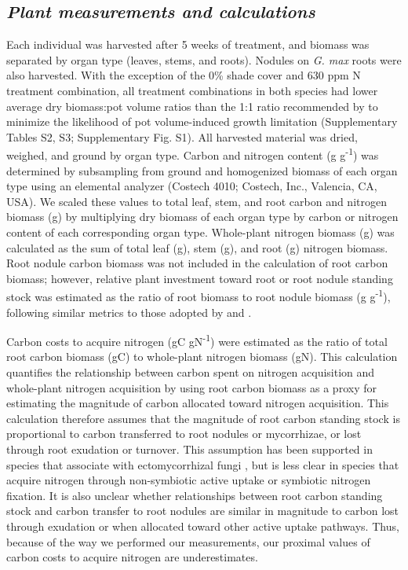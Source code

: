 \subsection{\textit{Plant measurements and calculations}}
Each individual was harvested after 5 weeks of treatment, and biomass was separated by organ type (leaves, stems, and roots). Nodules on \textit{G. max} roots were also harvested. With the exception of the 0\% shade cover and 630 ppm N treatment combination, all treatment combinations in both species had lower average dry biomass:pot volume ratios than the 1:1 ratio recommended by  to minimize the likelihood of pot volume-induced growth limitation (Supplementary Tables S2, S3; Supplementary Fig. S1). All harvested material was dried, weighed, and ground by organ type. Carbon and nitrogen content (g g\textsuperscript{-1}) was determined by subsampling from ground and homogenized biomass of each organ type using an elemental analyzer (Costech 4010; Costech, Inc., Valencia, CA, USA). We scaled these values to total leaf, stem, and root carbon and nitrogen biomass (g) by multiplying dry biomass of each organ type by carbon or nitrogen content of each corresponding organ type. Whole-plant nitrogen biomass (g) was calculated as the sum of total leaf (g), stem (g), and root (g) nitrogen biomass. Root nodule carbon biomass was not included in the calculation of root carbon biomass; however, relative plant investment toward root or root nodule standing stock was estimated as the ratio of root biomass to root nodule biomass (g g\textsuperscript{-1}), following similar metrics to those adopted by  and .

Carbon costs to acquire nitrogen (gC gN\textsuperscript{-1}) were estimated as the ratio of total root carbon biomass (gC) to whole-plant nitrogen biomass (gN). This calculation quantifies the relationship between carbon spent on nitrogen acquisition and whole-plant nitrogen acquisition by using root carbon biomass as a proxy for estimating the magnitude of carbon allocated toward nitrogen acquisition. This calculation therefore assumes that the magnitude of root carbon standing stock is proportional to carbon transferred to root nodules or mycorrhizae, or lost through root exudation or turnover. This assumption has been supported in species that associate with ectomycorrhizal fungi , but is less clear in species that acquire nitrogen through non-symbiotic active uptake or symbiotic nitrogen fixation. It is also unclear whether relationships between root carbon standing stock and carbon transfer to root nodules are similar in magnitude to carbon lost through exudation or when allocated toward other active uptake pathways. Thus, because of the way we performed our measurements, our proximal values of carbon costs to acquire nitrogen are underestimates.

